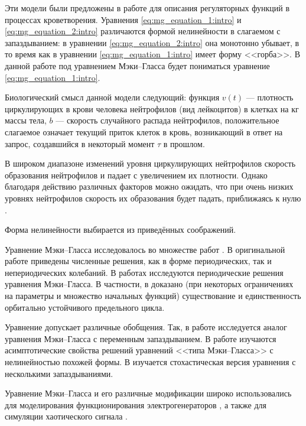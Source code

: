 Эти модели были предложены в работе \cite{Mackey1977} для описания регуляторных функций в процессах кроветворения. Уравнения \eqref{eq:mg_equation_1:intro} и \eqref{eq:mg_equation_2:intro} различаются формой нелинейности в слагаемом с запаздыванием: в уравнении \eqref{eq:mg_equation_2:intro} она монотонно убывает, в то время как в уравнении \eqref{eq:mg_equation_1:intro} имеет форму <<горба>>. В данной работе под уравнением Мэки--Гласса будет пониматься уравнение \eqref{eq:mg_equation_1:intro}.

Биологический смысл данной модели следующий: функция $v(t)$ --- плотность циркулирующих в крови человека нейтрофилов (вид лейкоцитов) в клетках на кг массы тела, $b$ --- скорость случайного распада нейтрофилов, положительное слагаемое означает текущий приток клеток в кровь, возникающий в ответ на запрос, создавшийся в некоторый момент $\tau$ в прошлом.

В широком диапазоне изменений уровня циркулирующих нейтрофилов скорость образования нейтрофилов и падает с увеличением их плотности. Однако благодаря действию различных факторов можно ожидать, что при очень низких уровнях нейтрофилов скорость их образования будет падать, приближаясь к нулю \cite[с. 85]{Mackey1977}.

Форма нелинейности выбирается из приведённых соображений.

Уравнение Мэки--Гласса исследовалось во множестве работ \cite{Junges2012, Berezansky2006, Su2011, Liz2002, Wu2007, Kubyshkin2016, Krisztin2020, Bartha2021}. В оригинальной работе \cite{Mackey1977} приведены численные решения, как в форме периодических, так и непериодических колебаний. В работах \cite{Krisztin2020, Bartha2021} исследуются периодические решения уравнения Мэки--Гласса. В частности, в \cite{Bartha2021} доказано (при некоторых ограничениях на параметры и множество начальных функций) существование и единственность орбитально устойчивого предельного цикла. 

Уравнение допускает различные обобщения. Так, в работе \cite{Berezansky2006} исследуется аналог уравнения Мэки--Гласса с переменным запаздыванием. В работе \cite{Liz2002} изучаются асимптотические свойства решений уравнений <<типа Мэки--Гласса>> с нелинейностью похожей формы. В \cite{Huang2024} изучается стохастическая версия уравнения с несколькими запаздываниями.

Уравнение Мэки--Гласса и его различные модификации широко использовались для моделирования функционирования электрогенераторов \cite{Tateno2012, Namajunas1995, Glyzin2018, Glyzin2018a}, а также для симуляции хаотического сигнала \cite{Grassberger1983, Amil2015, Amil2015a, Shahverdiev2006}.

